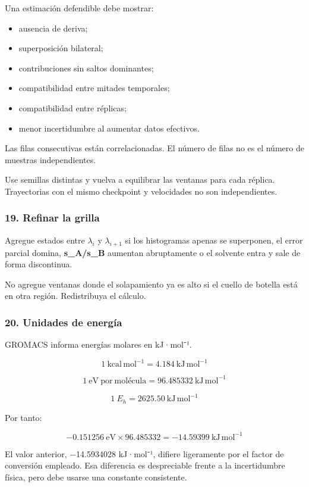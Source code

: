 \documentclass[
  spanish,
  11pt,
  a4paper]{article}
\providecommand{\tightlist}{%
  \setlength{\itemsep}{0pt}\setlength{\parskip}{0pt}}
\begin{document}
Una estimación defendible debe mostrar:

\begin{itemize}
\tightlist
\item
  ausencia de deriva;
\item
  superposición bilateral;
\item
  contribuciones sin saltos dominantes;
\item
  compatibilidad entre mitades temporales;
\item
  compatibilidad entre réplicas;
\item
  menor incertidumbre al aumentar datos efectivos.
\end{itemize}

Las filas consecutivas están correlacionadas. El número de filas no es
el número de muestras independientes.

Use semillas distintas y vuelva a equilibrar las ventanas para cada
réplica. Trayectorias con el mismo checkpoint y velocidades no son
independientes.

\subsubsection{19. Refinar la grilla}\label{refinar-la-grilla}

Agregue estados entre \(\lambda_i\) y \(\lambda_{i+1}\) si los
histogramas apenas se superponen, el error parcial domina,
\textbf{s\_A/s\_B} aumentan abruptamente o el solvente entra y sale de
forma discontinua.

No agregue ventanas donde el solapamiento ya es alto si el cuello de
botella está en otra región. Redistribuya el cálculo.

\subsubsection{20. Unidades de energía}\label{unidades-de-energuxeda}

GROMACS informa energías molares en kJ·mol⁻¹.

\[
1\ \mathrm{kcal\,mol^{-1}}
=
4.184\ \mathrm{kJ\,mol^{-1}}
\]

\[
1\ \mathrm{eV\ por\ molécula}
=
96.485332\ \mathrm{kJ\,mol^{-1}}
\]

\[
1\ E_h
=
2625.50\ \mathrm{kJ\,mol^{-1}}
\]

Por tanto:

\[
-0.151256\ \mathrm{eV}
\times
96.485332
=
-14.59399\ \mathrm{kJ\,mol^{-1}}
\]

El valor anterior, −14.5934028 kJ·mol⁻¹, difiere ligeramente por el
factor de conversión empleado. Esa diferencia es despreciable frente a
la incertidumbre física, pero debe usarse una constante consistente.
\end{document}
